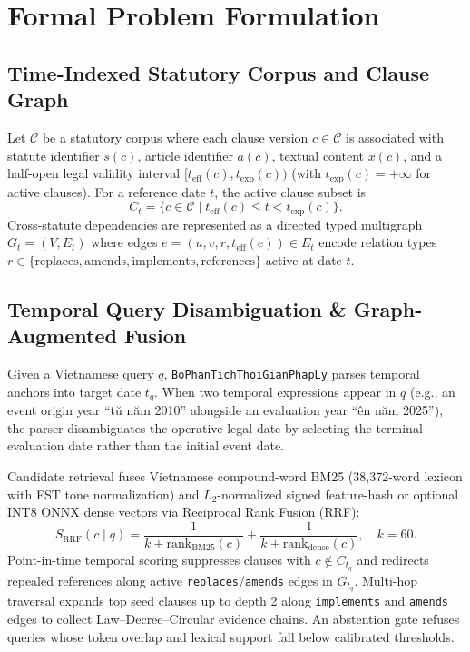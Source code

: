 \documentclass[11pt,a4paper]{article}
\begin{document}
\section{Formal Problem Formulation}

\subsection{Time-Indexed Statutory Corpus and Clause Graph}
Let $\mathcal{C}$ be a statutory corpus where each clause version $c \in \mathcal{C}$ is associated with statute identifier $s(c)$, article identifier $a(c)$, textual content $x(c)$, and a half-open legal validity interval $[t_{\mathrm{eff}}(c), t_{\mathrm{exp}}(c))$ (with $t_{\mathrm{exp}}(c) = +\infty$ for active clauses). For a reference date $t$, the active clause subset is
\begin{equation}
  C_t = \{ c \in \mathcal{C} \mid t_{\mathrm{eff}}(c) \le t < t_{\mathrm{exp}}(c) \}.
\end{equation}
Cross-statute dependencies are represented as a directed typed multigraph $G_t = (V, E_t)$ where edges $e = (u, v, r, t_{\mathrm{eff}}(e)) \in E_t$ encode relation types $r \in \{\text{replaces}, \text{amends}, \text{implements}, \text{references}\}$ active at date $t$.

\subsection{Temporal Query Disambiguation \& Graph-Augmented Fusion}
Given a Vietnamese query $q$, \texttt{BoPhanTichThoiGianPhapLy} parses temporal anchors into target date $t_q$. When two temporal expressions appear in $q$ (e.g., an event origin year ``t\u{u} n\u{a}m 2010'' alongside an evaluation year ``\dj\^{e}n n\u{a}m 2025''), the parser disambiguates the operative legal date by selecting the terminal evaluation date rather than the initial event date.

Candidate retrieval fuses Vietnamese compound-word BM25 (38,372-word lexicon with FST tone normalization) and $L_2$-normalized signed feature-hash or optional INT8 ONNX dense vectors via Reciprocal Rank Fusion (RRF):
\begin{equation}
  S_{\mathrm{RRF}}(c \mid q) = \frac{1}{k + \mathrm{rank}_{\mathrm{BM25}}(c)} + \frac{1}{k + \mathrm{rank}_{\mathrm{dense}}(c)}, \quad k = 60.
\end{equation}
Point-in-time temporal scoring suppresses clauses with $c \notin C_{t_q}$ and redirects repealed references along active \texttt{replaces}/\texttt{amends} edges in $G_{t_q}$. Multi-hop traversal expands top seed clauses up to depth 2 along \texttt{implements} and \texttt{amends} edges to collect Law--Decree--Circular evidence chains. An abstention gate refuses queries whose token overlap and lexical support fall below calibrated thresholds.
\end{document}
